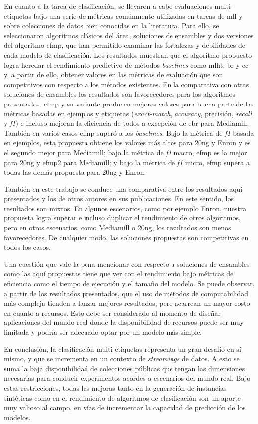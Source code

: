 En cuanto a la tarea de clasificación, se llevaron a cabo evaluaciones
multi-etiquetas bajo una serie de métricas comúnmente utilizadas en tareas de
\acrshort{mll} y sobre colecciones de datos bien conocidas en la literatura.
Para ello, se seleccionaron algoritmos clásicos del área, soluciones de
ensambles y dos versiones del algoritmo \acrshort{efmp}, que han permitido
examinar las fortalezas y debilidades de cada modelo de clasificación. Los
resultados muestran que el algoritmo propuesto logra heredar el rendimiento
predictivo de métodos \textit{baselines} como \acrshort{mlht}, \acrshort{br} y
\acrshort{cc} y, a partir de ello, obtener valores en las métricas de evaluación
que son competitivos con respecto a los métodos existentes. En la comparativa
con otras soluciones de ensambles los resultados son favorecedores para los
algoritmos presentados. \acrshort{efmp} y su variante producen mejores valores
para buena parte de las métricas basadas en ejemplos y etiquetas
(\textit{exact-match}, \textit{accuracy}, precisión, \textit{recall} y
\textit{f1}) e incluso mejoran la eficiencia de todos a excepción de
\acrshort{ebr} para Mediamill. También en varios casos \acrshort{efmp} superó a
los \textit{baselines}. Bajo la métrica de \textit{f1} basada en ejemplos, esta
propuesta obtiene los valores más altos para 20ng y Enron y es el segundo mejor
para Mediamill; bajo la métrica de \textit{f1} macro, \acrshort{efmp} es la
mejor para 20ng y \acrshort{efmp2} para Mediamill; y bajo la métrica de
\textit{f1} micro, \acrshort{efmp} supera a todas las demás propuesta para 20ng
y Enron.

También en este trabajo se conduce una comparativa entre los resultados aquí
presentados y los de otros autores en sus publicaciones. En este sentido, los
resultados son mixtos. En algunos escenarios, como por ejemplo Enron, nuestra
propuesta logra superar e incluso duplicar el rendimiento de otros algoritmos,
pero en otros escenarios, como Mediamill o 20ng, los resultados son menos
favorecedores. De cualquier modo, las soluciones propuestas son competitivas en
todos los casos.

Una cuestión que vale la pena mencionar con respecto a soluciones de ensambles
como las aquí propuestas tiene que ver con el rendimiento bajo métricas de
eficiencia como el tiempo de ejecución y el tamaño del modelo. Se puede
observar, a partir de los resultados presentados, que el uso de métodos de
computabilidad más compleja tienden a lanzar mejores resultados, pero acarrean
un mayor costo en cuanto a recursos. Esto debe ser considerado al momento de
diseñar aplicaciones del mundo real donde la disponibilidad de recursos puede
ser muy limitada y podría ser adecuado optar por un modelo más simple.

En conclusión, la clasificación multi-etiquetas representa un gran desafío en sí
mismo, y que se incrementa en un contexto de \textit{streamings} de datos. A
esto se suma la baja disponibilidad de colecciones públicas que tengan las
dimensiones necesarias para conducir experimentos acordes a escenarios del mundo
real. Bajo estas restricciones, todas las mejoras tanto en la generación de
instancias sintéticas como en el rendimiento de algoritmos de clasificación son
un aporte muy valioso al campo, en vías de incrementar la capacidad de
predicción de los modelos.
